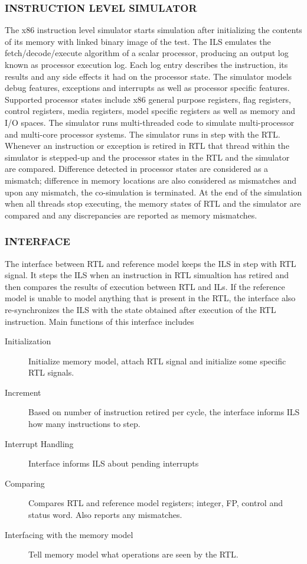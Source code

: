 \subsubsection {INSTRUCTION LEVEL SIMULATOR}
The x86 instruction level simulator starts simulation after initializing the contents of its memory with linked binary image of the test. The ILS emulates the fetch/decode/execute algorithm of a scalar processor, producing an output log known as processor execution log. Each log entry describes the instruction, its results and any side effects it had on the processor state. The simulator models debug features, exceptions and interrupts as well as processor specific features. Supported processor states include x86 general purpose registers, flag registers, control registers, media registers, model specific registers as well as memory and I/O spaces. The simulator runs multi-threaded code to simulate multi-processor and multi-core processor systems. 
The simulator runs in step with the RTL. Whenever an instruction or exception is retired in RTL that thread within the simulator is stepped-up and the processor states in the RTL and the simulator are compared. Difference detected in processor states are considered as a mismatch; difference in memory locations are also considered as mismatches and upon any mismatch, the co-simulation is terminated. At the end of the simulation when all threads stop executing, the memory states of RTL and the simulator are compared and any discrepancies are reported as memory mismatches.

\subsubsection {INTERFACE}
The interface between RTL and reference model keeps the ILS in step with RTL signal. It steps the ILS when an instruction in RTL simualtion has retired and then compares the results of execution between RTL and ILs. If the reference model is unable to model anything that is present in the RTL, the interface also re-synchronizes the ILS with the state obtained after execution of the RTL instruction.
Main functions of this interface includes
\begin{description}
	\item[Initialization] Initialize memory model, attach RTL signal and initialize some specific RTL signals.
	\item[Increment] Based on number of instruction retired per cycle, the interface informs ILS how many instructions to step.
	\item[Interrupt Handling] Interface informs ILS about pending interrupts
	\item[Comparing] Compares RTL and reference model registers; integer, FP, control and status word. Also reports any mismatches.
	\item[Interfacing with the memory model] Tell memory model what operations are seen by the RTL. 
\end{description}

